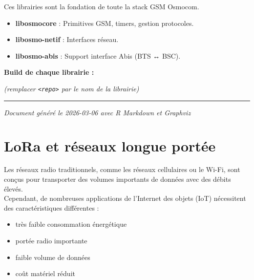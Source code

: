\documentclass[
  french,
]{article}
\newenvironment{Shaded}{\begin{snugshade}}{\end{snugshade}}
\newcommand{\AttributeTok}[1]{\textcolor[rgb]{0.13,0.29,0.53}{#1}}
\newcommand{\BuiltInTok}[1]{#1}
\newcommand{\ExtensionTok}[1]{#1}
\newcommand{\FunctionTok}[1]{\textcolor[rgb]{0.13,0.29,0.53}{\textbf{#1}}}
\newcommand{\KeywordTok}[1]{\textcolor[rgb]{0.13,0.29,0.53}{\textbf{#1}}}
\newcommand{\NormalTok}[1]{#1}
\newcommand{\OperatorTok}[1]{\textcolor[rgb]{0.81,0.36,0.00}{\textbf{#1}}}
\newcommand{\VariableTok}[1]{\textcolor[rgb]{0.00,0.00,0.00}{#1}}
\providecommand{\tightlist}{%
  \setlength{\itemsep}{0pt}\setlength{\parskip}{0pt}}
\begin{document}
Ces librairies sont la fondation de toute la stack GSM Osmocom.

\begin{itemize}
\tightlist
\item
  \textbf{libosmocore} : Primitives GSM, timers, gestion protocoles.
\item
  \textbf{libosmo-netif} : Interfaces réseau.
\item
  \textbf{libosmo-abis} : Support interface Abis (BTS ↔ BSC).
\end{itemize}

\textbf{Build de chaque librairie :}

\begin{Shaded}
\end{Shaded}

\emph{(remplacer \texttt{\textless{}repo\textgreater{}} par le nom de la
librairie)}

\begin{center}\rule{0.5\linewidth}{0.5pt}\end{center}

\emph{Document généré le 2026-03-06 avec R Markdown et Graphviz}

\section{LoRa et réseaux longue
portée}\label{lora-et-ruxe9seaux-longue-portuxe9e}

Les réseaux radio traditionnels, comme les réseaux cellulaires ou le
Wi-Fi, sont conçus pour transporter des volumes importants de données
avec des débits élevés.\\
Cependant, de nombreuses applications de l'Internet des objets (IoT)
nécessitent des caractéristiques différentes :

\begin{itemize}
\tightlist
\item
  très faible consommation énergétique
\item
  portée radio importante
\item
  faible volume de données
\item
  coût matériel réduit
\end{itemize}
\end{document}
